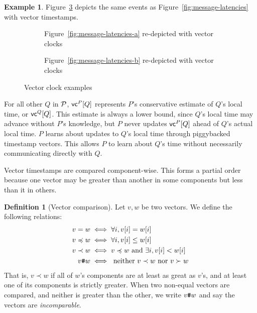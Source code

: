 \documentclass[]             %
{NASA}                       %
\theoremstyle{definition}
\newtheorem{example}[theorem]{Example}
\newtheorem{definition}[theorem]{Definition}
\begin{document}
\begin{example}
  Figure~\ref{fig:message-latencies-vector} depicts the same events as
  Figure~\ref{fig:message-latencies} with vector timestamps.
\end{example}

\begin{figure}
  \setlength\belowcaptionskip{5ex}

  \begin{subfigure}{1\textwidth}
    \centering
    
    \caption{Figure~\ref{fig:message-latencies-a} re-depicted with vector clocks}
    \label{fig:message-latencies-vector-a}
  \end{subfigure}

  \vspace{4ex}

  \begin{subfigure}{1\textwidth}
    \centering 
    \caption{Figure~\ref{fig:message-latencies-b} re-depicted with vector clocks}
    \label{fig:message-latencies-vector-b}
  \end{subfigure}

  \caption{Vector clock examples}
  \label{fig:message-latencies-vector}
\end{figure}
\afterpage{\clearpage}

For all other $Q$ in $\mathcal{P}$, $\mathsf{vc}^{P}[Q]$ represents $P$'s
conservative estimate of $Q$'s local time, or $\mathsf{vc}^{Q}[Q]$. This
estimate is always a lower bound, since $Q$'s local time may advance
without $P$'s knowledge, but $P$ never updates $\mathsf{vc}^{P}[Q]$ ahead of
$Q$'s actual local time. $P$ learns about updates to $Q$'s local time
through piggybacked timestamp vectors. This allows $P$ to learn about
$Q$'s time without necessarily communicating directly with $Q$.

Vector timestamps are compared component-wise. This forms a partial
order because one vector may be greater than another in some
components but less than it in others.

\begin{definition}[Vector comparison]
  Let $v, w$ be two vectors. We define the following relations:
  \begin{align*}
             v = w &\iff \forall i, v[i] = w[i] \\
  v \preccurlyeq w &\iff \forall i, v[i] \leq w[i] \\
         v \prec w &\iff v \preccurlyeq w \textrm{ and } \exists i, v[i] < w[i] \\
            v {\textrm{\texttt{\#}}} w &\iff \textrm{ neither } v \prec w \textrm{ nor } v \succ w
  \end{align*}
  That is, $v \prec w$ if all of $w$'s components are at least as
  great as $v$'s, and at least one of its components is strictly
  greater. When two non-equal vectors are compared, and neither is
  greater than the other, we write $v {\textrm{\texttt{\#}}} w$ and say the vectors
  are \emph{incomparable}.
\end{definition}
\end{document}
